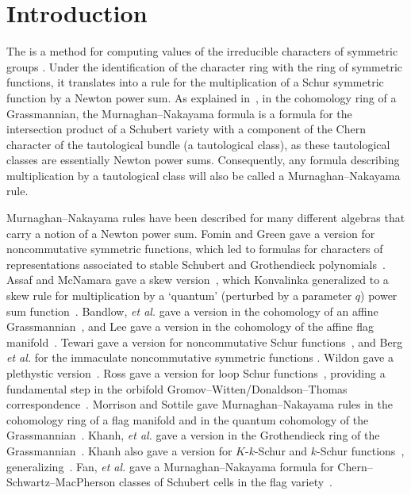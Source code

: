 \documentclass[11pt]{article}
\theoremstyle{definition}
\numberwithin{equation}{section}
\newcommand{\defcolor}[1]{{\color{RoyalBlue}#1}}
\newcommand{\demph}[1]{\defcolor{{\sl #1}}}
\begin{document}
\section{Introduction}

The \demph{Murnaghan--Nakayama rule} is a method for computing values of the
irreducible characters of symmetric groups \cite{Mu37,Na41a,Na41b}.
Under the identification of the character ring with the ring of symmetric
functions, it translates into a rule for the multiplication of a Schur
symmetric function by a Newton power sum.
As explained in~\cite[Sect.~2]{MorrisonSottile}, in the cohomology ring of a Grassmannian, the
Murnaghan--Nakayama formula is a formula for the intersection product of a Schubert variety
with a component of the Chern character of the tautological bundle (a tautological class), as these tautological classes are
essentially Newton power sums.
Consequently, any formula describing multiplication by a tautological class will also be called a Murnaghan--Nakayama rule.

Murnaghan--Nakayama rules have been described for many different algebras
that carry a notion of a Newton power sum.
        Fomin and Green gave a version for noncommutative symmetric functions, which
        led to formulas for characters of representations associated to stable Schubert
        and Grothendieck polynomials~\cite{FoGr98}.
        Assaf and McNamara gave a skew version~\cite{A-McN}, which Konvalinka generalized to a skew
        rule for multiplication by a `quantum' (perturbed by a parameter $q$) power sum
        function~\cite{Ko12}.
        Bandlow, \emph{et al.} gave a version in the cohomology of an affine Grassmannian~\cite{BSZ11},
        and Lee gave a version in the cohomology of the affine flag manifold~\cite{Lee}.
        Tewari gave a version for noncommutative Schur functions~\cite{Tewari},
        and Berg \emph{et al.} for the immaculate noncommutative symmetric functions \cite{BBSSZ}.
        Wildon gave a plethystic version~\cite{Wildon}.
        Ross gave a version for loop Schur functions~\cite{Ro14}, providing
        a fundamental step in the orbifold Gromov--Witten/Donaldson--Thomas
        correspondence~\cite{RoZo13}.
        Morrison and Sottile gave Murnaghan--Nakayama rules in
        the cohomology ring of a flag manifold and in the quantum cohomology of the
        Grassmannian~\cite{MorrisonSottile}.
        Khanh, \emph{et al.} gave a version in the Grothendieck ring of the Grassmannian~\cite{KHST}.
        Khanh also gave a version for $K$-$k$-Schur and $k$-Schur functions~\cite{Khanh}, generalizing~\cite{BSZ11}.
        Fan, \emph{et al.}  gave a Murnaghan--Nakayama formula for Chern--Schwartz--MacPherson classes of
        Schubert cells in the flag variety~\cite{FGX}.
\end{document}

